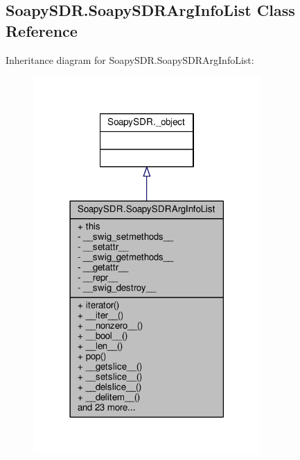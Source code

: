 \subsection{Soapy\+S\+D\+R.\+Soapy\+S\+D\+R\+Arg\+Info\+List Class Reference}
\label{classSoapySDR_1_1SoapySDRArgInfoList}


Inheritance diagram for Soapy\+S\+D\+R.\+Soapy\+S\+D\+R\+Arg\+Info\+List\+:
\nopagebreak
\begin{figure}[H]
\begin{center}
\leavevmode
\includegraphics[width=246pt]{d6/d81/classSoapySDR_1_1SoapySDRArgInfoList__inherit__graph}
\end{center}
\end{figure}


